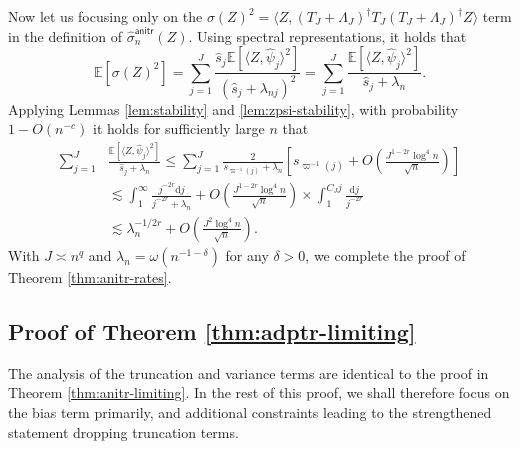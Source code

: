 \documentclass[aos]{imsart}
\renewcommand{\hat}{\widehat}
\newcommand{\ud}{\mathrm d}
\newcommand{\anitr}{\mathsf{anitr}}
\theoremstyle{plain}
\theoremstyle{definition}
\theoremstyle{definition}
\begin{document}
\begin{appendix}
Now let us focusing only on the $\sigma(Z)^2=\langle Z,(T_J+\Lambda_J)^\dagger T_J (T_J+\Lambda_J)^\dagger Z\rangle$ term in the definition of $\hat\sigma_n^\anitr(Z)$.
Using spectral representations, it holds that
\begin{equation}
\mathbb E[\sigma(Z)^2] = \sum_{j=1}^J \frac{\hat s_j \mathbb E[\langle Z,\hat\psi_j\rangle^2]}{(\hat s_j+\lambda_{nj})^2}
=\sum_{j=1}^J\frac{\mathbb E[\langle Z,\hat\psi_j\rangle^2]}{{\hat s_j}+\lambda_n}.
\label{eq:proof-anitr-rates-1}
\end{equation}
Applying Lemmas \ref{lem:stability} and \ref{lem:zpsi-stability}, with probability $1-O(n^{-c})$ it holds for sufficiently large $n$ that
\begin{align}
\sum_{j=1}^J&\frac{\mathbb E[\langle Z,\hat\psi_j\rangle^2]}{{\hat s_j}+{\lambda_n}}
\leq \sum_{j=1}^J\frac{2}{{s_{\varpi^{-1}(j)}}+\lambda_n}\left[s_{\varpi^{-1}(j)} + O\left(\frac{J^{1-2r}\log^4 n}{\sqrt{n}}\right)\right]\nonumber\\
&\lesssim \int_1^{\infty} \frac{j^{-2r}\ud j}{j^{-2r}+{\lambda_n}} + O\left(\frac{J^{1-2r}\log^4 n}{\sqrt{n}}\right)\times \int_1^{C_J j}\frac{\ud j}{j^{-2r}}\nonumber\\
&\lesssim \lambda_n^{-1/2r} + O\left(\frac{J^2\log^4 n}{\sqrt{n}}\right).
\end{align}
With $J\asymp n^q$ and $\lambda_n=\omega(n^{-1-\delta})$ for any $\delta>0$, we complete the proof of Theorem \ref{thm:anitr-rates}.


\subsection{Proof of Theorem \ref{thm:adptr-limiting}}

The analysis of the truncation and variance terms are identical to the proof in Theorem \ref{thm:anitr-limiting}.
In the rest of this proof, we shall therefore focus on the bias term primarily, and additional constraints leading to the strengthened statement dropping truncation terms.


\end{appendix}
\end{document}

